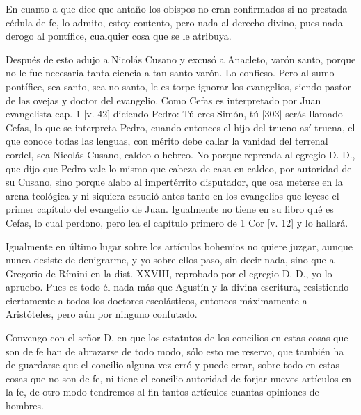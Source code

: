 En cuanto a que dice que antaño los obispos no eran confirmados si no prestada cédula de fe, lo admito, estoy contento, pero nada al derecho divino, pues nada derogo al pontífice, cualquier cosa que se le atribuya.

Después de esto adujo a Nicolás Cusano y excusó a Anacleto, varón santo, porque no le fue necesaria tanta ciencia a tan santo varón. Lo confieso. Pero al sumo pontífice, sea santo, sea no santo, le es torpe ignorar los evangelios, siendo pastor de las ovejas y doctor del evangelio. Como Cefas es interpretado por Juan evangelista cap. 1 [v. 42] diciendo Pedro: Tú eres Simón, tú [303] serás llamado Cefas, lo que se interpreta Pedro, cuando entonces el hijo del trueno así truena, el que conoce todas las lenguas, con mérito debe callar la vanidad del terrenal cordel, sea Nicolás Cusano, caldeo o hebreo. No porque reprenda al egregio D. D., que dijo que Pedro vale lo mismo que cabeza de casa en caldeo, por autoridad de su Cusano, sino porque alabo al impertérrito disputador, que osa meterse en la arena teológica y ni siquiera estudió antes tanto en los evangelios que leyese el primer capítulo del evangelio de Juan. Igualmente no tiene en su libro qué es Cefas, lo cual perdono, pero lea el capítulo primero de 1 Cor [v. 12] y lo hallará.

Igualmente en último lugar sobre los artículos bohemios no quiere juzgar, aunque nunca desiste de denigrarme, y yo sobre ellos paso, sin decir nada, sino que a Gregorio de Rímini en la dist. XXVIII, reprobado por el egregio D. D., yo lo apruebo. Pues es todo él nada más que Agustín y la divina escritura, resistiendo ciertamente a todos los doctores escolásticos, entonces máximamente a Aristóteles, pero aún por ninguno confutado.

Convengo con el señor D. en que los estatutos de los concilios en estas cosas que son de fe han de abrazarse de todo modo, sólo esto me reservo, que también ha de guardarse que el concilio alguna vez erró y puede errar, sobre todo en estas cosas que no son de fe, ni tiene el concilio autoridad de forjar nuevos artículos en la fe, de otro modo tendremos al fin tantos artículos cuantas opiniones de hombres.

